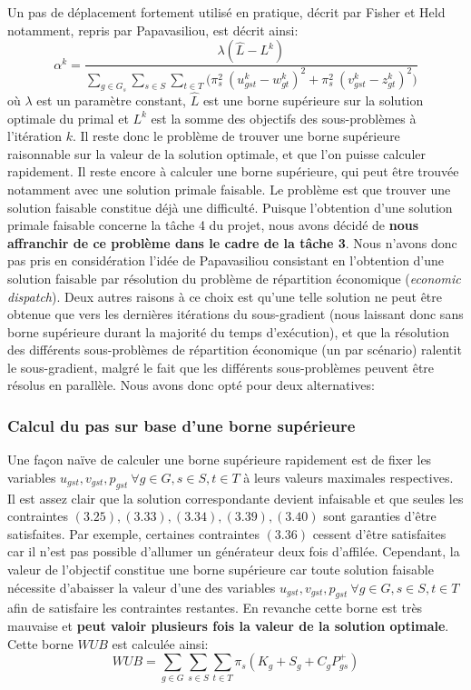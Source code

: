 Un pas de déplacement fortement utilisé en pratique, décrit par Fisher et Held notamment, repris par Papavasiliou, est décrit ainsi:
\begin{equation}
    \alpha^k = \frac{\lambda (\hat{L} - L^k)}{\sum\limits_{g \in G_s} \sum\limits_{s \in S} \sum\limits_{t \in T} \big(\pi_s^2 \ (u_{gst}^k - w_{gt}^k)^2 + \pi_s^2 \ (v_{gst}^k - z_{gt}^k)^2\big)}
\end{equation}
où $\lambda$ est un paramètre constant, $\hat{L}$ est une borne supérieure sur la solution optimale du primal et $L^k$ est la somme des objectifs des sous-problèmes
à l'itération $k$. Il reste donc le problème de trouver une borne supérieure raisonnable sur la valeur de la solution optimale,
et que l'on puisse calculer rapidement. Il reste encore à calculer une borne supérieure, qui peut être trouvée notamment avec une solution primale faisable.
Le problème est que trouver une solution faisable constitue déjà une difficulté. Puisque l'obtention d'une solution primale faisable
concerne la tâche 4 du projet, nous avons décidé de \textbf{nous affranchir de ce problème dans le cadre de la tâche 3}.
Nous n'avons donc pas pris en considération l'idée de Papavasiliou consistant en l'obtention d'une solution faisable par résolution
du problème de répartition économique (\textit{economic dispatch}).
Deux autres raisons à ce choix est qu'une telle solution ne peut être obtenue que vers les dernières itérations du sous-gradient
(nous laissant donc sans borne supérieure durant la majorité du temps d'exécution), et que la résolution des différents sous-problèmes
de répartition économique (un par scénario) ralentit le sous-gradient, malgré le fait que les différents sous-problèmes peuvent être résolus en parallèle.
Nous avons donc opté pour deux alternatives:

\subsubsection{Calcul du pas sur base d'une borne supérieure}

Une façon naïve de calculer une borne supérieure rapidement est de fixer les variables
$u_{gst}, v_{gst}, p_{gst} \ \forall g \in G, s \in S, t \in T$ à leurs valeurs maximales respectives.
Il est assez clair que la solution correspondante devient infaisable et que seules les contraintes 
$(3.25), (3.33), (3.34), (3.39), (3.40)$ sont garanties d'être satisfaites. Par exemple, certaines contraintes $(3.36)$ cessent d'être satisfaites
car il n'est pas possible d'allumer un générateur deux fois d'affilée. Cependant, la valeur de l'objectif constitue une borne supérieure
car toute solution faisable nécessite d'abaisser la valeur d'une des variables $u_{gst}, v_{gst}, p_{gst} \ \forall g \in G, s \in S, t \in T$
afin de satisfaire les contraintes restantes. En revanche cette borne est très mauvaise et \textbf{peut valoir plusieurs fois la valeur de la solution optimale}.
Cette borne $WUB$ est calculée ainsi:
\begin{equation}
    WUB = \sum\limits_{g \in G} \sum\limits_{s \in S} \sum\limits_{t \in T} \pi_s (K_g + S_g + C_g P_{gs}^{+})
\end{equation}

